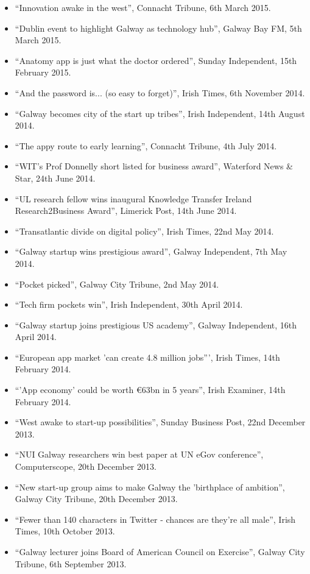 \documentclass[10pt,a4paper]{res} %
\begin{document}
\begin{resume}
{\begin{itemize}
\item ``Innovation awake in the west'', Connacht Tribune, 6th March 2015.
\item ``Dublin event to highlight Galway as technology hub'', Galway Bay FM, 5th March 2015.
\item ``Anatomy app is just what the doctor ordered'', Sunday Independent, 15th February 2015.
\item ``And the password is... (so easy to forget)'', Irish Times, 6th November 2014.
\item ``Galway becomes city of the start up tribes'', Irish Independent, 14th August 2014.
\item ``The appy route to early learning'', Connacht Tribune, 4th July 2014.
\item ``WIT's Prof Donnelly short listed for business award'', Waterford News \& Star, 24th June 2014.
\item ``UL research fellow wins inaugural Knowledge Transfer Ireland Research2Business Award'', Limerick Post, 14th June 2014.
\item ``Transatlantic divide on digital policy'', Irish Times, 22nd May 2014.
\item ``Galway startup wins prestigious award'', Galway Independent, 7th May 2014.
\item ``Pocket picked'', Galway City Tribune, 2nd May 2014.
\item ``Tech firm pockets win'', Irish Independent, 30th April 2014.
\item ``Galway startup joins prestigious US academy'', Galway Independent, 16th April 2014.
\item ``European app market 'can create 4.8 million jobs''', Irish Times, 14th February 2014.
\item ``'App economy' could be worth \euro{}63bn in 5 years'', Irish Examiner, 14th February 2014.
\item ``West awake to start-up possibilities'', Sunday Business Post, 22nd December 2013.
\item ``NUI Galway researchers win best paper at UN eGov conference'', Computerscope, 20th December 2013.
\item ``New start-up group aims to make Galway the 'birthplace of ambition'', Galway City Tribune, 20th December 2013.
\item ``Fewer than 140 characters in Twitter - chances are they're all male'', Irish Times, 10th October 2013.
\item ``Galway lecturer joins Board of American Council on Exercise'', Galway City Tribune, 6th September 2013.

\end{itemize}}
\end{resume}
\end{document}
